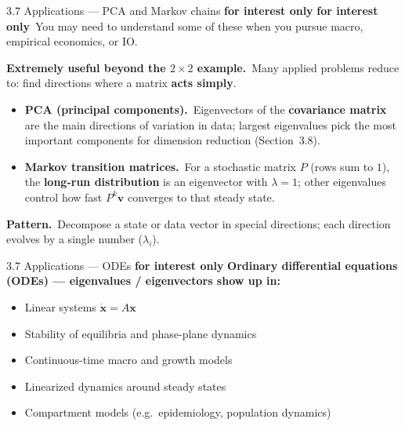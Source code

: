 \documentclass[11pt,aspectratio=169]{beamer}
\newcommand{\InterestOnly}{\textcolor{mAccent}{\textbf{for interest only}}}
\begin{document}
\begin{frame}{3.7 Applications --- PCA and Markov chains \InterestOnly}
  \footnotesize
  {\scriptsize \InterestOnly\
  You may need to understand some of these when you pursue macro, empirical economics, or IO.}

  \medskip
  \textbf{Extremely useful beyond the $2\times 2$ example.}\
  Many applied problems reduce to: find directions where a matrix \textbf{acts simply}.

  \medskip
  \begin{itemize}
    \item \textbf{PCA (principal components).}\
      Eigenvectors of the \textbf{covariance matrix} are the main directions of variation in data;
      largest eigenvalues pick the most important components for dimension reduction
      (Section~3.8).
    \item \textbf{Markov transition matrices.}\
      For a stochastic matrix $P$ (rows sum to $1$), the \textbf{long-run distribution} is an eigenvector
      with $\lambda=1$;
      other eigenvalues control how fast $P^k\mathbf{v}$ converges to that steady state.
  \end{itemize}

  \medskip
  \textbf{Pattern.}\
  Decompose a state or data vector in special directions; each direction evolves by a single number ($\lambda_i$).
\end{frame}

\begin{frame}{3.7 Applications --- ODEs \InterestOnly}
  \footnotesize
  \textbf{Ordinary differential equations (ODEs) --- eigenvalues / eigenvectors show up in:}
  \begin{itemize}
    \item Linear systems $\dot{\mathbf{x}}=A\mathbf{x}$
    \item Stability of equilibria and phase-plane dynamics
    \item Continuous-time macro and growth models
    \item Linearized dynamics around steady states
    \item Compartment models (e.g.\ epidemiology, population dynamics)
  \end{itemize}
\end{frame}
\end{document}
